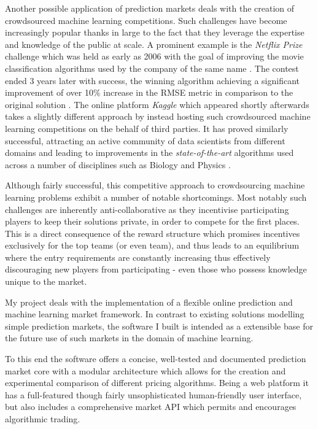 \documentclass[bsc,frontabs,twoside,singlespacing,parskip,deptreport]{infthesis}     %
\begin{document}
    Another possible application of prediction markets deals with the creation of crowdsourced machine learning competitions. Such challenges have become increasingly popular thanks in large to the fact that they leverage the expertise and knowledge of the public at scale. A prominent example is the {\em Netflix Prize} challenge which was held as early as 2006 with the goal of improving the movie classification algorithms used by the company of the same name \cite{bennett_netflix_2007}. The contest ended 3 years later with success, the winning algorithm achieving a significant improvement of over 10\% increase in the RMSE metric in comparison to the original solution \cite{koren_bellkor_2009}. The online platform {\em Kaggle} which appeared shortly afterwards takes a slightly different approach by instead hosting such crowdsourced machine learning competitions on the behalf of third parties. It has proved similarly successful, attracting an active community of data scientists from different domains and leading to improvements in the {\em state-of-the-art} algorithms used across a number of disciplines such as Biology \cite{bentzien_crowd_2013} and Physics \cite{harvey_observing_2014}. 

    Although fairly successful, this competitive approach to crowdsourcing machine learning problems exhibit a number of notable shortcomings. Most notably such challenges are inherently anti-collaborative as they incentivise participating players to keep their solutions private, in order to compete for the first places. This is a direct consequence of the reward structure which promises incentives exclusively for the top teams (or even team), and thus leads to an equilibrium where the entry requirements are constantly increasing thus effectively discouraging new players from participating - even those who possess knowledge unique to the market. 

    My project deals with the implementation of a flexible online prediction and machine learning market framework. In contrast to existing solutions modelling simple prediction markets, the software I built is intended as a extensible base for the future use of such markets in the domain of machine learning. 

To this end the software offers a concise, well-tested and documented prediction market core with a modular architecture which allows for the creation and experimental comparison of different pricing algorithms. Being a web platform it has a full-featured though fairly unsophisticated human-friendly user interface, but also includes a comprehensive market API which permits and encourages algorithmic trading. 
\end{document}
